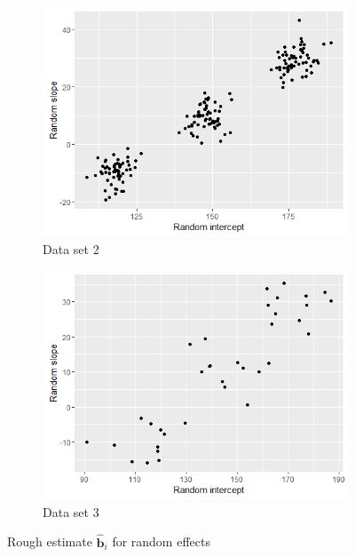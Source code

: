 \begin{figure}[!htb]
\centering
\captionsetup{justification=centering}
\begin{subfigure}[b]{0.4\textwidth}
		\includegraphics[width=\textwidth]{mainmatter/chapter_5_simulation_study/ds_3wellsep_randplot.png}
        \caption{\label{fig : ds_3wellsep_randplot}Data set 2}
	\end{subfigure}
	\begin{subfigure}[b]{0.4\textwidth}
		\includegraphics[width=\textwidth]{mainmatter/chapter_5_simulation_study/ds_3wellsep3ppg_randplot.png}
       \caption{\label{fig : ds_3wellsep3ppg_randplot}Data set 3}
	\end{subfigure}    
    
\caption{\label{fig : ds_3comp_3ppgwelsep}Rough estimate $\boldsymbol{\hat{b}}_i$ for random effects}
\end{figure}

